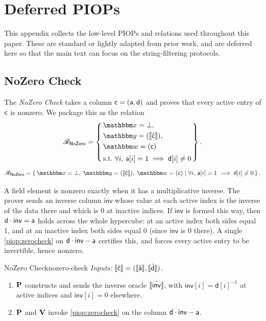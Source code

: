 \section{Deferred PIOPs}
\label{sec:deferred-piops}
This appendix collects the low-level PIOPs and relations used throughout this paper. These are standard or lightly adapted from prior work, and are deferred here so that the main text can focus on the string-filtering protocols.

\subsection{NoZero Check}
The \emph{NoZero Check} takes a column $\mathsf{c} = (\mathsf{a},\mathsf{d})$ and proves that every active entry of $\mathsf{c}$ is nonzero. We package this as the relation
\ifsp
\begin{displaymath}
\NPRelation_{\mathsf{NoZero}} = \left\{\,
  \begin{aligned}
    & \NPInstance = \bot,\\
    & \NPInstancey = (\Oracle{\hat{\col}}),\\
    & \NPWitness = (\col)\\[2pt]
    & \text{s.t.}\ \forall i,\, \mathsf{a}[i] = 1 \implies \mathsf{d}[i] \neq 0
  \end{aligned}
\,\right\}.
\end{displaymath}
\else
\begin{displaymath}
\NPRelation_{\mathsf{NoZero}} = \left\{\,
  \NPInstance = \bot,\;
  \NPInstancey = (\Oracle{\hat{\col}}),\;
  \NPWitness = (\col)
  \;\middle|\;
    \forall i,\, \mathsf{a}[i] = 1 \implies \mathsf{d}[i] \neq 0
\,\right\}.
\end{displaymath}
\fi

A field element is nonzero exactly when it has a multiplicative inverse. The prover sends an inverse column $\mathsf{inv}$ whose value at each active index is the inverse of the data there and which is $0$ at inactive indices. If $\mathsf{inv}$ is formed this way, then $\mathsf{d}\cdot\mathsf{inv} = \mathsf{a}$ holds across the whole hypercube: at an active index both sides equal $1$, and at an inactive index both sides equal $0$ (since $\mathsf{inv}$ is $0$ there). A single \cref{piop:zerocheck} on $\mathsf{d}\cdot\mathsf{inv} - \mathsf{a}$ certifies this, and forces every active entry to be invertible, hence nonzero.
\begin{DefinePIOP}{NoZero Check}{nozero-check}
  \emph{Inputs:} $\llbracket\hat{\mathsf{c}}\rrbracket = (\llbracket\tilde{\mathsf{a}}\rrbracket, \llbracket\tilde{\mathsf{d}}\rrbracket)$.
  \begin{enumerate}[nosep]
    \item $\bf{P}$ constructs and sends the inverse oracle $\llbracket\tilde{\mathsf{inv}}\rrbracket$, with $\mathsf{inv}[i] = \mathsf{d}[i]^{-1}$ at active indices and $\mathsf{inv}[i] = 0$ elsewhere.
    \item $\bf{P}$ and $\bf{V}$ invoke \cref{piop:zerocheck} on the column $\mathsf{d}\cdot\mathsf{inv} - \mathsf{a}$.
  \end{enumerate}
\end{DefinePIOP}

